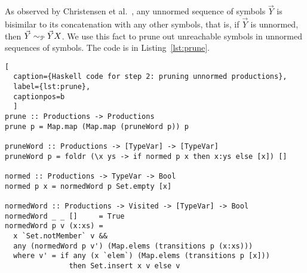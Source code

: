 
As observed by Christensen et
al.~\cite{DBLP:journals/iandc/ChristensenHS95}, any unnormed sequence
of symbols $\vec Y$ is bisimilar to its concatenation with any other
symbols, that is, if $\vec Y$ is unnormed, then
$\vec Y \sim_{\mathcal P} \vec YX$.
%
%
We use this fact
to prune out unreachable symbols in unnormed sequences of symbols. The
code is in Listing~\ref{lst:prune}. 

\begin{lstlisting}[
  caption={Haskell code for step 2: pruning unnormed productions},
  label={lst:prune},
  captionpos=b
  ]
prune :: Productions -> Productions
prune p = Map.map (Map.map (pruneWord p)) p

pruneWord :: Productions -> [TypeVar] -> [TypeVar]
pruneWord p = foldr (\x ys -> if normed p x then x:ys else [x]) []

normed :: Productions -> TypeVar -> Bool
normed p x = normedWord p Set.empty [x]

normedWord :: Productions -> Visited -> [TypeVar] -> Bool
normedWord _ _ []     = True
normedWord p v (x:xs) =
  x `Set.notMember` v &&
  any (normedWord p v') (Map.elems (transitions p (x:xs)))
  where v' = if any (x `elem`) (Map.elems (transitions p [x]))
               then Set.insert x v else v
\end{lstlisting}

